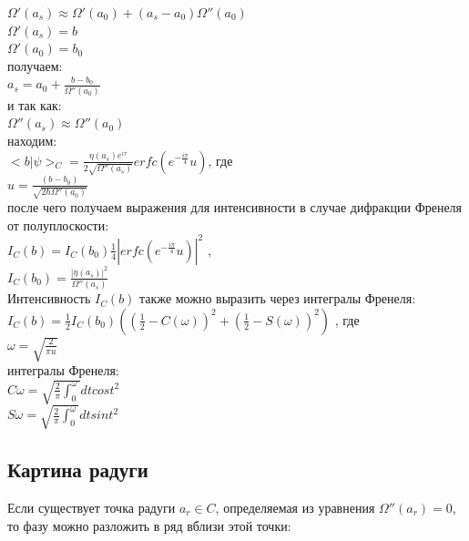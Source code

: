 \documentclass[11pt]{report}
\begin{document}
$\Omega'(a_s) \approx \Omega'(a_0) + (a_s-a_0)\Omega''(a_0) $ \\

$\Omega'(a_s) =b $ \\

$\Omega'(a_0) =b_0 $ \\

получаем: \\

$a_s = a_0+\frac{b-b_0}{\Omega''(a_0)}$ \\

 и так как:\\
 
  $\Omega''(a_s) \approx \Omega''(a_0)$ \\
  
  находим: \\
 
 $<b|\psi>_C = \frac{\eta(a_s)e^{i\tau}}{2\sqrt{\Omega''(a_s)}}erfc(e^{-\frac{i\pi}{4}}u)$, где \\
 
 $u = \frac{(b-b_0)}{\sqrt{2\hbar\Omega''(a_0)}}$ \\
  
  после чего получаем выражения для интенсивности в случае дифракции Френеля от полуплоскости: \\
  
  $I_C(b) = I_C(b_0)\frac{1}{4}|erfc(e^{-\frac{i\pi}{4}}u)|^2$ , \\
  
  $I_C(b_0) = \frac{|\eta(a_s)|^2}{\Omega''(a_s)}$ \\


Интенсивность $I_C(b)$ также можно выразить через интегралы Френеля: \\

$I_C(b) = \frac{1}{2}I_C(b_0)((\frac{1}{2}-C(\omega))^2 + (\frac{1}{2}-S(\omega))^2)$ , где \\

$\omega = \sqrt{\frac{2}{\pi u}}$ \\

интегралы Френеля:\\

$C{\omega} = \sqrt{\frac{2}{\pi}\int_0^\omega}dtcost^2$ \\

$S{\omega} = \sqrt{\frac{2}{\pi}\int_0^\omega}dtsint^2$ \\



\subsection{Картина радуги}
Если существует точка радуги $a_r \in C$, определяемая из уравнения $\Omega''(a_r)=0$, то фазу можно разложить в ряд вблизи этой точки: \\
\end{document}
